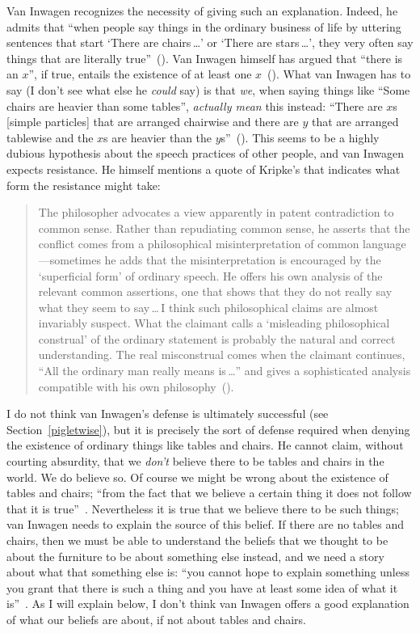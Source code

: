 \documentclass[11pt]{article}
\newenvironment{squote}{\begin{quote}\begin{singlespace}}{\end{singlespace}\end{quote}}
\begin{document}
\begin{spacing}{1.5}
Van Inwagen recognizes the necessity of giving such an explanation. Indeed, he admits that ``when people say things in the ordinary business of life by uttering sentences that start `There are chairs\,\ldots ' or `There are stars\,\ldots ', they very often say things that are literally true''~(\citeyear[102]{inwagen1995}). Van Inwagen himself has argued that ``there is an $x$'', if true, entails the existence of at least one $x$~(\citeyear[237--241]{inwagen1998}). What van Inwagen has to say (I don't see what else he {\em could} say) is that {\em we}, when saying things like ``Some chairs are heavier than some tables'', {\em actually mean} this instead: ``There are $x$s [simple particles] that are arranged chairwise and there are $y$ that are arranged tablewise and the $x$s are heavier than the $y$s''~(\citeyear[109]{inwagen1995}). This seems to be a highly dubious hypothesis about the speech practices of other people, and van Inwagen expects resistance. He himself mentions a quote of Kripke's that indicates what form the resistance might take:
\begin{squote}
The philosopher advocates a view apparently in patent contradiction to common sense. Rather than repudiating common sense, he asserts that the conflict comes from a philosophical misinterpretation of common language---sometimes he adds that the misinterpretation is encouraged  by the `superficial form' of ordinary speech. He offers his own analysis of the relevant common assertions, one that shows that they do not really say what they seem to say\,\ldots\,I think such philosophical claims are almost invariably suspect. What the claimant calls a `misleading philosophical construal' of the ordinary statement is probably the natural and correct understanding. The real misconstrual comes when the claimant continues, ``All the ordinary man really means is\,\ldots '' and gives a sophisticated analysis compatible with his own philosophy~(\citeyear[65]{kripke1982}).
\end{squote}

I do not think van Inwagen's defense is ultimately successful (see Section~\ref{pigletwise}), but it is precisely the sort of defense required when denying the existence of ordinary things like tables and chairs. He cannot claim, without courting absurdity, that we {\em don't} believe there to be tables and chairs in the world. We do believe so. Of course we might be wrong about the existence of tables and chairs; ``from the fact that we believe a certain thing it does not follow that it is true''~\citep[21]{stroud2000a}. Nevertheless it is true that we believe there to be such things; van Inwagen needs to explain the source of this belief. If there are no tables and chairs, then we must be able to understand the beliefs that we thought to be about the furniture to be about something else instead, and we need a story about what that something else is: ``you cannot hope to explain something unless you grant that there is such a thing and you have at least some idea of what it is''~\citep[97]{stroud2000a}. As I will explain below, I don't think van Inwagen offers a good explanation of what our beliefs are about, if not about tables and chairs.


\end{spacing}
\end{document}
